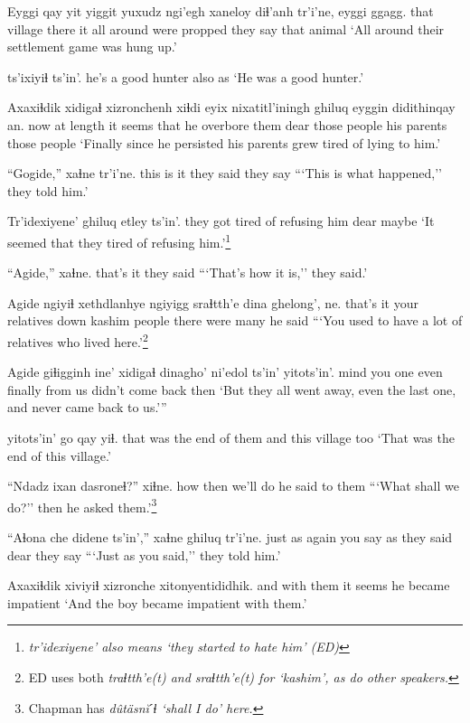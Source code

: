 \documentclass[12pt]{article}
\begin{document}
\gll Eyggi qay  yit yiggit yuxudz ngi'egh {xaneloy diɬ'anh} tr'i'ne, eyggi  ggagg.
that village  there it all  around {were propped} {they say} that  animal
\glt `All around their settlement game was hung up.'
\glend

 ts'ixiyiɬ ts'in'.
{he's a good hunter} also  as
\glt `He was a good hunter.'
\glend

\gll Axaxiɬdik xidigaɬ  xizronchenh xiɬdi {eyix nixatitl'iningh} ghiluq eyggin didithinqay an.
now  {at length} {it seems} that {he overbore them} dear {those people} {his parents} {those people}
\glt `Finally since he persisted his parents grew tired of lying to him.'
\glend

\gll ``Gogide,''  xaɬne  tr'i'ne.
{this is it} {they said} {they say}
\glt ```This is what happened,'' they told him.'
\glend

\gll Tr'idexiyene' ghiluq etley ts'in'.
{they got tired of refusing him} dear maybe {}
\glt `It seemed that they tired of refusing him.'\footnote{\em tr'idexiyene' \em also means `they started to hate him' (ED)}
\glend

\gll ``Agide,'' xaɬne.
{that's it} {they said}
\glt ```That's how it is,'' they said.'
\glend

\gll Agide {ngiyiɬ  xethdlanhye} ngiyigg sraɬtth'e dina ghelong', ne.
{that's it} {your relatives} down  kashim  people {there were many} {he said}
\glt ```You used to have a lot of relatives who lived here.'\footnote{ED uses both \em traɬtth'e(t) \em and \em sraɬtth'e(t) \em for `kashim', as do other speakers.}
\glend

\gll Agide  giɬigginh ine' xidigaɬ  dinagho' {ni'edol  ts'in'} yitots'in'.
{mind you} one  even finally {from us} {didn't come back}  then
\glt `But they all went away, even the last one, and never came back to us.'''
\glend

 yitots'in' go qay yiɬ.
{that was the end of them} and  this village too
\glt  `That was the end of this village.'
\glend

\gll ``Ndadz ixan dasroneɬ?'' xiɬne.
how  then {we'll do} {he said to them}
\glt ```What shall we do?'' then he asked them.'\footnote{Chapman has \em d\^ut\"asn\u{i}ˊɬ \em `shall I do' here.}
\glend

\gll ``Aɬona che didene ts'in','' xaɬne ghiluq tr'i'ne.
{just as} again {you say} as {they said} dear {they say}
\glt ```Just as you said,'' they told him.'
\glend

\gll Axaxiɬdik xiviyiɬ xizronche xitonyentididhik.
and {with them} {it seems} {he became impatient}
\glt `And the boy became impatient with them.'
\glend
\end{document}

